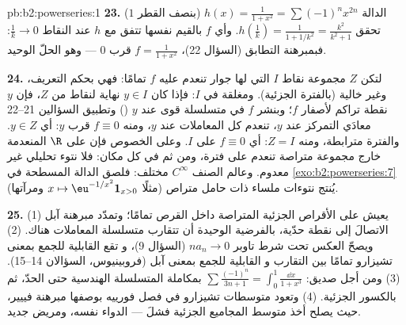 \begin{solution}{pb:b2:powerseries:1}
\textbf{23.} الدالة $h(x) = \frac{1}{1+x^2} =
\sum(-1)^nx^{2n}$ (بنصف القطر $1$) تحقق $h(\frac1k) =
\frac{1}{1 + 1/k^2} = \frac{k^2}{k^2+1}$. وأي  $f$
بالقيم نفسها تتفق مع $h$ عند النقاط $\frac1k \to 0$:
فبمبرهنة التطابق (السؤال 22)، $f = \frac{1}{1+x^2}$
قرب $0$ --- وهو الحلّ الوحيد.

\textbf{24.} لتكن $Z$ مجموعة نقاط $I$ التي لها
جوار تنعدم عليه $f$ تمامًا: فهي  بحكم
التعريف، وغير خالية (بالفترة الجزئية). ومغلقة في $I$: فإذا كان $y
\in I$ نهاية لنقاط من $Z$، فإن $y$ نقطة تراكم
لأصفار $f$؛ وبنشر $f$ في متسلسلة قوى عند $y$
() وتطبيق السؤالين 21--22 معادَي التمركز عند $y$،
تنعدم كل المعاملات عند $y$، ومنه $f \equiv 0$ قرب $y$: أي $y
\in Z$. والفترة مترابطة، ومنه $Z = I$: أي $f \equiv 0$ على
$I$. وعلى الخصوص فإن  على $\R$ المنعدمة
خارج مجموعة متراصة تنعدم على فترة، ومن ثم
في كل مكان: فلا نتوء تحليلي غير معدوم. وعالم الصنف $C^\infty$
مختلف: فلصق الدالة المسطحة في
\cref{exo:b2:powerseries:7} (مثلًا $x \mapsto
\eu^{-1/x^2}\mathbf 1_{x>0}$ ومرآتها) يُنتج نتوءات
ملساء ذات حامل متراص.

\textbf{25.} (1) يعيش  على الأقراص الجزئية المتراصة
داخل القرص تمامًا؛ وتمدّد مبرهنة آبل الاتصالَ إلى
نقطة حدّية، بالفرضية الوحيدة أن تتقارب
متسلسلة المعاملات هناك. (2) ويصحّ العكس
تحت شرط تاوبر $na_n \to 0$ (السؤال 9)، و
تقع القابلية للجمع بمعنى تشيزارو تمامًا بين التقارب و
القابلية للجمع بمعنى آبل (فروبينيوس، السؤالان 14--15). (3) ومن أجل
صديق: $\sum\frac{(-1)^n}{3n+1} = \int_0^1\frac{\dd x}{1+x^3}$
بمكاملة المتسلسلة الهندسية حتى الحدّ، ثم
بالكسور الجزئية. (4) وتعود متوسطات تشيزارو في فصل
فورييه بوصفها مبرهنة فييير، حيث يصلح أخذ متوسط المجاميع الجزئية
فشلَ  --- الدواء نفسه،
ومريض جديد.
\end{solution}
